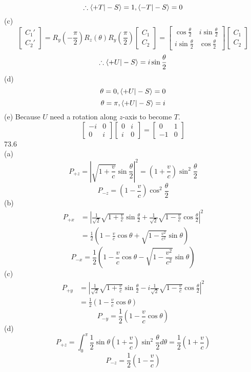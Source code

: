 \documentclass[utf8]{ctexart}
\begin{document}
\[\therefore\braket{+T|-S}=1,\braket{-T|-S}=0\]
(c)
\[\begin{bmatrix}
	C_1'\\
	C_2'
\end{bmatrix}
=R_y(-\frac{\pi}{2})R_z(\theta)R_y(\frac{\pi}{2})\begin{bmatrix}
	C_1\\
	C_2
\end{bmatrix}
=\begin{bmatrix}
	\cos\frac{\theta}{2}&i\sin\frac{\theta}{2}\\
	i\sin\frac{\theta}{2}&\cos\frac{\theta}{2}
\end{bmatrix}\begin{bmatrix}
C_1\\
C_2
\end{bmatrix}\]
\[\therefore\braket{+U|-S}=i\sin\frac{\theta}{2}\]
(d)
\[\theta=0,\braket{+U|-S}=0\]
\[\theta=\pi,\braket{+U|-S}=i\]
(e)
Because $U$ need a rotation along $z$-axis to become $T$.
\[\begin{bmatrix}
	-i&0\\
	0&i
\end{bmatrix}\begin{bmatrix}
	0&i\\
	i&0
\end{bmatrix}=\begin{bmatrix}
0&1\\
-1&0
\end{bmatrix}\]
73.6\\
(a)
\[P_{+z}=|\sqrt{1+\frac{v}{c}}\sin\frac{\theta}{2}|^2=(1+\frac{v}{c})\sin^2\frac{\theta}{2}\]
\[P_{-z}=(1-\frac{v}{c})\cos^2\frac{\theta}{2}\]
(b)
\begin{align*}
	P_{+x}&=|\frac{1}{\sqrt{2}}\sqrt{1+\frac{v}{c}}\sin\frac{\theta}{2}+\frac{1}{\sqrt{2}}\sqrt{1-\frac{v}{c}}\cos\frac{\theta}{2}|^2\\
	&=\frac{1}{2}(1-\frac{v}{c}\cos\theta+\sqrt{1-\frac{v^2}{c^2}}\sin\theta)
\end{align*}
\[P_{-x}=\frac{1}{2}(1-\frac{v}{c}\cos\theta-\sqrt{1-\frac{v^2}{c^2}}\sin\theta)\]
(c)
\begin{align*}
	P_{+y}&=|\frac{1}{\sqrt{2}}\sqrt{1+\frac{v}{c}}\sin\frac{\theta}{2}-i\frac{1}{\sqrt{2}}\sqrt{1-\frac{v}{c}}\cos\frac{\theta}{2}|^2\\
	&=\frac{1}{2}(1-\frac{v}{c}\cos\theta)
\end{align*}
\[P_{-y}=\frac{1}{2}(1-\frac{v}{c}\cos\theta)\]
(d)
\[P_{+z}=\int_{0}^{\pi}\frac{1}{2}\sin\theta(1+\frac{v}{c})\sin^2\frac{\theta}{2}d\theta=\frac{1}{2}(1+\frac{v}{c})\]
\[P_{-z}=\frac{1}{2}(1-\frac{v}{c})\]
\end{document}
